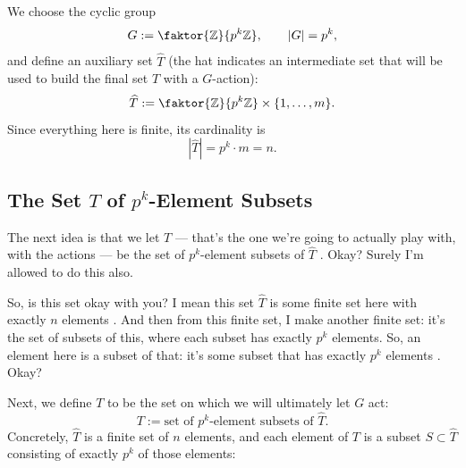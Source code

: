 \begin{proofWrapper}
\begin{content}
We choose the cyclic group
\[
G := \faktor{\mathbb{Z}}{p^k\mathbb{Z}}, \qquad |G| = p^k,
\]
and define an auxiliary set $\widehat{T}$ (the hat indicates an intermediate set that will be used to build the final set $T$ with a $G$-action):
\[
\widehat{T} := \faktor{\mathbb{Z}}{p^k\mathbb{Z}} \times \{1, \dots, m\}.
\]
Since everything here is finite, its cardinality is
\begin{equation}\label{eq:card-t-hat}
|\widehat{T}| = p^k \cdot m = n.
\end{equation}
\end{content}

\subsection{The Set \texorpdfstring{$T$}{T} of \texorpdfstring{$p^k$}{p\textasciicircum k}-Element Subsets}

\begin{speech}[00:29:46 - 00:30:44]
The next idea is that we let $T$ --- that's the one we're going to actually play with, with the actions --- be the set of $p^k$-element subsets of $\widehat{T}$ . Okay? Surely I'm allowed to do this also.

So, is this set okay with you? I mean this set $\widehat{T}$ is some finite set here with exactly $n$ elements . And then from this finite set, I make another finite set: it's the set of subsets of this, where each subset has exactly $p^k$ elements. So, an element here is a subset of that: it's some subset that has exactly $p^k$ elements . Okay?
\end{speech}

\begin{content}
Next, we define $T$ to be the set on which we will ultimately let $G$ act:
\[
T := \text{set of } p^k\text{-element subsets of } \widehat{T}.
\]
Concretely, $\widehat{T}$ is a finite set of $n$ elements, and each element of $T$ is a subset $S \subset \widehat{T}$ consisting of exactly $p^k$ of those elements:


\end{content}
\end{proofWrapper}
